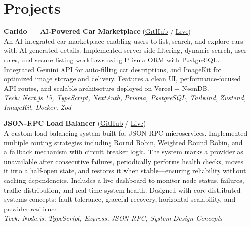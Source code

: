 \documentclass[a4paper,10pt]{article}
\begin{document}
\section*{Projects}


\textbf{Carido — AI-Powered Car Marketplace}
(\href{https://github.com/divy-03/car-app}{GitHub} /
\href{https://carido.vercel.app/}{Live}) \\
An AI-integrated car marketplace enabling users to list, search, and explore cars with AI-generated details. Implemented server-side filtering, dynamic search, user roles, and secure listing workflows using Prisma ORM with PostgreSQL. Integrated Gemini API for auto-filling car descriptions, and ImageKit for optimized image storage and delivery. Features a clean UI, performance-focused API routes, and scalable architecture deployed on Vercel + NeonDB. \\
\textit{Tech: Next.js 15, TypeScript, NextAuth, Prisma, PostgreSQL, Tailwind, Zustand, ImageKit, Docker, Zod}

\textbf{JSON-RPC Load Balancer}
(\href{https://github.com/divy-03/rpc-load-balancer}{GitHub} /
\href{https://rpc-lb-dashboard.onrender.com}{Live}) \\
A custom load-balancing system built for JSON-RPC microservices. Implemented multiple routing strategies including Round Robin, Weighted Round Robin, and a fallback mechanism with circuit breaker logic. The system marks a provider as unavailable after consecutive failures, periodically performs health checks, moves it into a half-open state, and restores it when stable—ensuring reliability without caching dependencies. Includes a live dashboard to monitor node status, failures, traffic distribution, and real-time system health. Designed with core distributed systems concepts: fault tolerance, graceful recovery, horizontal scalability, and provider resilience. \\
\textit{Tech: Node.js, TypeScript, Express, JSON-RPC, System Design Concepts}
\end{document}
